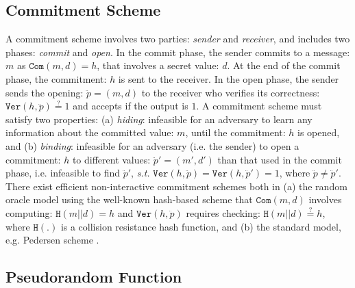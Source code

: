 
\subsection{Commitment Scheme} 

A commitment scheme involves two parties:  \emph{sender} and  \emph{receiver}, and includes  two phases: \emph{commit} and  \emph{open}. In the commit phase, the sender  commits to a message: $m$ as $\mathtt{Com}(m,d)=h$, that involves a secret value: $d$. At the end of the commit phase,  the commitment: $h$ is sent to the receiver. In the open phase, the sender sends the opening: $\ddot{p}=(m,d)$ to the receiver who verifies its correctness: $\mathtt{Ver}(h,\ddot{p})\stackrel{\scriptscriptstyle ?}=1$ and accepts if the output is $1$.  A commitment scheme must satisfy two properties: (a) \textit{hiding}: infeasible for an adversary  to learn any information about the committed  value: $m$, until the commitment: $h$ is opened, and (b) \textit{binding}:   infeasible for an adversary (i.e. the sender) to open a commitment: $h$ to different values: $\ddot{p}'=(m',d')$ than that used in the commit phase, i.e. infeasible to find  $\ddot{p}'$, \textit{s.t.} $\mathtt{Ver}(h,\ddot{p})=\mathtt{Ver}(h,\ddot{p}')=1$, where $\ddot{p}\neq \ddot{p}'$.  There exist efficient non-interactive  commitment schemes both in (a) the random oracle model using the well-known hash-based scheme  that $\mathtt{Com}(m,d)$ involves computing: $\mathtt{H}(m||d)=h$ and $\mathtt{Ver}(h,\ddot{p})$ requires checking: $\mathtt{H}(m||d)\stackrel{\scriptscriptstyle ?}=h$, where $\mathtt{H}(.)$ is a collision resistance hash function, and (b)  the standard model, e.g. Pedersen scheme \cite{Pedersen91}. 


\vspace{-5mm}


\subsection{Pseudorandom Function}

\vspace{-2mm}


